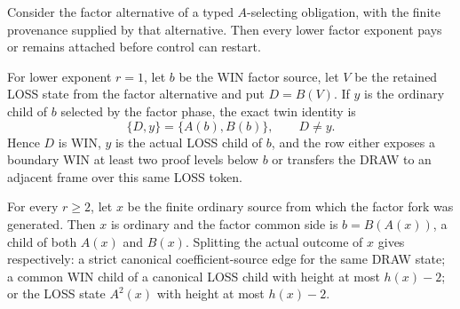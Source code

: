 \begin{lemma}
\label{lem:factor-fork-pay}
Consider the factor alternative of a typed $A$-selecting obligation, with the
finite provenance supplied by that alternative.  Then every lower factor
exponent pays or remains attached before control can restart.

For lower exponent $r=1$, let $b$ be the WIN factor source, let $V$ be the
retained LOSS state from the factor alternative and put $D=B(V)$.  If $y$ is
the ordinary child of $b$ selected by the factor phase, the exact twin identity
is
\[
 \{D,y\}=\{A(b),B(b)\},\qquad D\ne y.
\]
Hence $D$ is WIN, $y$ is the actual LOSS child of $b$, and the row either
exposes a boundary WIN at least two proof levels below $b$ or transfers the
DRAW to an adjacent frame over this same LOSS token.

For every $r\ge2$, let $x$ be the finite ordinary source from which the
factor fork was generated.  Then $x$ is ordinary and the factor common side is
$b=B(A(x))$, a child of both $A(x)$ and $B(x)$.  Splitting the actual outcome
of $x$ gives respectively: a strict canonical coefficient-source edge for the
same DRAW state; a common WIN child of a canonical LOSS child with height at
most $h(x)-2$; or the LOSS state $A^2(x)$ with height at most $h(x)-2$.
\end{lemma}

